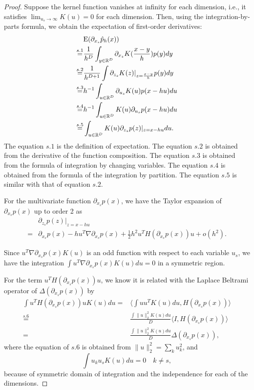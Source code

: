 \documentclass[aos,preprint]{imsart}
\theoremstyle{remark}
\begin{document}
\begin{appendix}
\begin{proof}
Suppose the kernel function vanishes at infinity for each dimension, i.e., it satisfies $\lim_{u_s\rightarrow \infty}K(u)=0$ for each dimension. Then, using the integration-by-parts formula, we obtain the expectation of first-order derivatives:
\begin{equation}\label{Expectation}
\begin{aligned}
&{\rm E} (\partial_{x_s} \hat{p}_h(x)) \\
\overset{s.1}{=}& \frac{1}{h^D} \int_{y\in \mathbb{R}^D}{\partial_{x_s}}  K(\frac{x-y}{h}) p(y) dy  \\
\overset{s.2}{=}&\frac{1}{h^{D+1}}\int \partial_{z_s} K(z)|_{z=\frac{x-y}{h}} p(y) dy\\
\overset{s.3}{=}&h^{-1} \int_ {u\in \mathbb{R}^D} \partial_{u_s} K(u) p(x-hu)  d u\\
\overset{s.4}{=}&h^{-1}\int_ {u\in \mathbb{R}^D} K(u) \partial_{u_s} p(x-hu) d u \\
\overset{s.5}{=}& \int_ {u\in \mathbb{R}^D} K(u) \partial_{z_s}p(z)|_{z=x-hu} d u.
\end{aligned}
\end{equation}
The equation $s.1$ is the definition of expectation. The equation $s.2$ is obtained from the derivative of the function composition. The equation $s.3$ is obtained from the formula of integration by changing variables. The equation $s.4$ is obtained from the formula of the integration by partition. The equation $s.5$ is similar with that of equation $s.2$.

For the multivariate function $\partial_{x_s} p(x)$, we have the Taylor expansion of $\partial_{x_s} p(x)$ up to order 2 as
\begin{equation}\label{Taylor}
\begin{aligned}
&\partial_{z_s} p(z)|_{z=x-hu}\\
= &\partial_{x_s} p(x) -  h u^T\nabla \partial_{x_s} p(x) + \frac{1}{2}h^2 u^T H(\partial_{x_s}p(x))u + o(h^2).
\end{aligned}
\end{equation}

Since $u^T \nabla \partial_{x_s} p(x) K(u)$ is an odd function with respect to each variable $u_s$, we have the integration $\int u^T \nabla \partial_{x_s} p(x) K(u) du = 0 $ in a symmetric region. 

For the term $u^T H(\partial_{x_s}p(x))u$, we know it is related with the Laplace Beltrami operator of $\Delta(\partial_{x_s}p(x))$ by
\[
\begin{aligned}
\int u^T H(\partial_{x_s}p(x))u K(u) du =& \langle \int uu^TK(u) du, H(\partial_{x_s}p(x))\rangle\\
\overset{s.6}{=}&\frac{\int \|u\|_2^2K(u)du}{D} \langle  I, H(\partial_{x_s}p(x))\rangle\\
=&\frac{\int \|u\|_2^2K(u)du}{D} \Delta(\partial_{x_s}p(x)),
\end{aligned}
\]
where the equation of $s.6$ is obtained from $\|u\|_2^2 = \sum_k u^2_k$, and
\[
\int u_k u_s K(u)du=0 \quad k\neq s,
\] because of symmetric domain of integration and the independence  for each of the dimensions. 


\end{proof}
\end{appendix}
\end{document}
